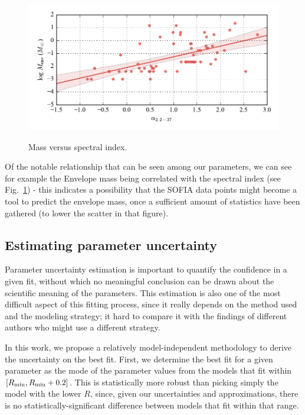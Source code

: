\begin{figure}[!h]
\begin{center}
\includegraphics[width=\textwidth]{Figures/massVSalpha.pdf}
\label{fig:massVSalpha}
\vspace{-1cm}
\caption[Mass versus spectral index]{Mass versus spectral index.}
\end{center}
\end{figure}

Of the notable relationship that can be seen among our parameters, we can see for example the Envelope mass being correlated with the spectral index (see Fig.~\ref{fig:massVSalpha}) - this indicates a possibility that the SOFIA data points might become a tool to predict the envelope mass, once a sufficient amount of statistics have been gathered (to lower the scatter in that figure). 



\subsection{Estimating parameter uncertainty}

Parameter uncertainty estimation is important to quantify the confidence in a given fit, without which no meaningful conclusion can be drawn about the scientific meaning of the parameters. This estimation is also one of the most difficult aspect of this fitting process, since it really depends on the method used and the modeling strategy; it hard to compare it with the findings of different authors who might use a different strategy. 

In this work, we propose a relatively model-independent methodology to derive the uncertainty on the best fit. First, we determine the best fit for a given parameter as the mode of the parameter values from the models that fit within $[R_\textrm{min},R_\textrm{min}+0.2]$. This is statistically more robust than picking simply the model with the lower $R$, since, given our uncertainties and approximations, there is no statistically-significant difference between models that fit within that range.

